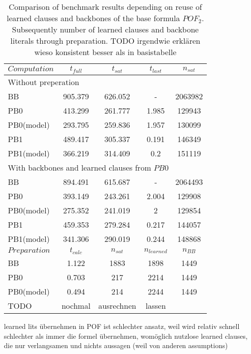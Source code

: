 \begin{wraptable}{r}{8cm}
\begin{tabular}{l | c c c c}
$Computation$ & $t_{full}$ & $t_{sat}$ & $t_{last}$& $n_{sat}$\\
\hline 
\multicolumn{3}{l}{Without preperation}\\
BB & 905.379 & 626.052 & - & 2063982\\
PB0 & 413.299 & 261.777 & 1.985 & 129943\\
PB0(model) & 293.795 & 259.836 & 1.957 & 130099\\
PB1 & 489.417 & 305.337 & 0.191 & 146349\\
PB1(model) & 366.219 & 314.409 & 0.2 & 151119\\
\hline
\multicolumn{5}{l}{With backbones and learned clauses from $PB0$}\\
BB & 894.491 & 615.687 & - & 2064493\\
PB0 & 393.149 & 243.261 & 2.004 & 129908\\
PB0(model) & 275.352 & 241.019 & 2 & 129854\\
PB1 & 459.353 & 279.284 & 0.217 & 144057\\
PB1(model) & 341.306 & 290.019 & 0.244 & 148868\\
\hline \hline 
$Preparation$ & $t_{calc}$ & $n_{sat}$& $n_{learned}$ & $n_{BB}$  \\
\hline
BB         & 1.122 &1883& 1898 & 1449\\
PB0        & 0.703 &217& 2214 & 1449\\
PB0(model) & 0.494 &214& 2244 & 1449 \\
TODO &nochmal& ausrechnen& lassen
\end{tabular}
\caption{Comparison of benchmark results depending on reuse of learned clauses and backbones of the base formula $POF_2$. Subsequently number of learned clauses and backbone literals through preparation. TODO irgendwie erklären wieso konsistent besser als in basistabelle}
\label{tab:pofPrepBenefit}
\end{wraptable}

learned lits übernehmen in POF ist schlechter ansatz, weil wird relativ schnell schlechter als immer die formel übernehmen, womöglich nutzlose learned clauses, die nur verlangsamen und nichts aussagen (weil von anderen assumptions)



